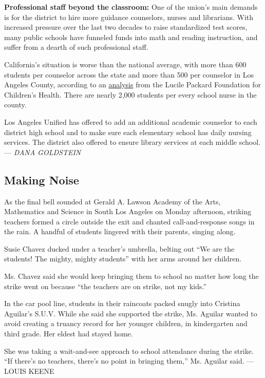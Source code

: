 \textbf{Professional staff beyond the classroom:} One of the union's
main demands is for the district to hire more guidance counselors,
nurses and librarians. With increased pressure over the last two decades
to raise standardized test scores, many public schools have funneled
funds into math and reading instruction, and suffer from a dearth of
such professional staff.

California's situation is worse than the national average, with more
than 600 students per counselor across the state and more than 500 per
counselor in Los Angeles County, according to an
\href{https://www.kidsdata.org/topic/126/pupilsupportpersonnel-type/table\#fmt=2391\&loc=2,364\&tf=95\&ch=276,278,280,277,279,807,1136\&sortColumnId=0\&sortType=asc}{analysis}
from the Lucile Packard Foundation for Children's Health. There are
nearly 2,000 students per every school nurse in the county.

Los Angeles Unified has offered to add an additional academic counselor
to each district high school and to make sure each elementary school has
daily nursing services. The district also offered to ensure library
services at each middle school. --- \emph{DANA GOLDSTEIN}

\hypertarget{making-noise}{%
\subsection{Making Noise}\label{making-noise}}

As the final bell sounded at Gerald A. Lawson Academy of the Arts,
Mathematics and Science in South Los Angeles on Monday afternoon,
striking teachers formed a circle outside the exit and chanted
call-and-response songs in the rain. A handful of students lingered with
their parents, singing along.

Susie Chavez ducked under a teacher's umbrella, belting out ``We are the
students! The mighty, mighty students'' with her arms around her
children.

Ms. Chavez said she would keep bringing them to school no matter how
long the strike went on because ``the teachers are on strike, not my
kids.''

In the car pool line, students in their raincoats packed snugly into
Cristina Aguilar's S.U.V. While she said she supported the strike, Ms.
Aguilar wanted to avoid creating a truancy record for her younger
children, in kindergarten and third grade. Her eldest had stayed home.

She was taking a wait-and-see approach to school attendance during the
strike. ``If there's no teachers, there's no point in bringing them,''
Ms. Aguilar said. --- LOUIS KEENE

